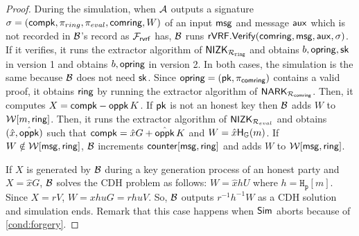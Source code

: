 \begin{proof}
	
	
	During the simulation, when $ \mathcal{A} $ outputs a signature $ \sigma = (\mathsf{compk},\pi_{ring},\pi_{eval},\mathsf{comring},W) $ of an input  $ \mathsf{msg} $ and message $ \mathsf{aux} $ which is not recorded in $ \mathcal{B} $'s record as $ \mathcal{F}_{\textsf{rvrf}} $ has, $ \mathcal{B} $ runs $ {\mathsf{rVRF}}.{\mathsf{Verify}}(\mathsf{comring},\mathsf{msg}, \mathsf{aux}, \sigma) $. If it verifies, it runs the extractor algorithm of $ {\mathsf{NIZK}}_{\mathcal{R}_{\mathtt{ring}}} $ and obtains $ b, \mathsf{opring}, \mathsf{sk} $ in version 1 and obtains $ b, \mathsf{opring} $ in version 2. In both cases, the simulation is the same because $ \mathcal{B} $ does not need $ \mathsf{sk} $.  Since $\mathsf{opring} = (\mathsf{pk}, \pi_{\mathsf{comring}})$ contains a valid proof,  it obtains $ \mathsf{ring} $ by running the extractor algorithm of $ \mathsf{NARK}_{\mathcal{R}_{\mathsf{comring}}} $.  	
	 Then, it computes $ X = \mathsf{compk} - \mathsf{oppk} \, K $.
	If $ \mathsf{pk} $ is not an honest key then $\mathcal{B} $ adds $ W $  to $ \mathcal{W}[m, \mathsf{ring}] $.  
	Then, it  runs the extractor algorithm of $ {\mathsf{NIZK}}_{\mathcal{R}_{eval}} $ and obtains $(\hat{x},\hat{\mathsf{oppk}} )$ such that $ \mathsf{compk} = \hat{x}G + \hat{\mathsf{oppk}} \, K $ and $ W = \hat{x} {\mathsf{H}}_{{\mathbb{G}}}(m) $. If  $ W \notin \mathcal{W}[\mathsf{msg}, \mathsf{ring}] $, $ \mathcal{B} $ increments  $ \mathsf{counter}[\mathsf{msg},\mathsf{ring}] $ and adds $ W $ to $ \mathcal{W}[\mathsf{msg},\mathsf{ring}] $.
	
	If $ X  $ is generated by $ \mathcal{B} $ during a key generation process of an honest party and $ X = \hat{x}G $, $ \mathcal{B} $ solves the CDH problem as follows: $ W = \hat{x} h U $ where $ h = \mathtt{H_p}[m] $. Since $ X = r V $, $ W = xhuG =rhuV $. So, $ \mathcal{B} $ outputs $ r^{-1}h^{-1}W $ as a CDH solution and simulation ends. Remark that this case happens when $ \mathsf{Sim} $ aborts because of \ref{cond:forgery}.
	

\end{proof}
